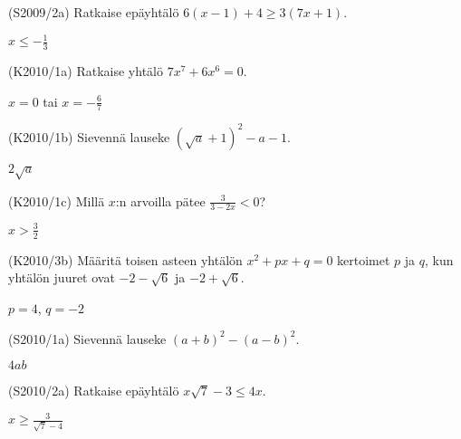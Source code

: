 \begin{tehtava}
(S2009/2a) Ratkaise epäyhtälö $6(x-1)+4 \geq 3(7x+1)$. 
\begin{vastaus}
$x \leq -\frac{1}{3}$
\end{vastaus}
\end{tehtava}


\begin{tehtava}
(K2010/1a) Ratkaise yhtälö $7x^7+6x^6=0$.
\begin{vastaus}
$x=0$ tai $x=-\frac{6}{7}$
\end{vastaus}
\end{tehtava}

\begin{tehtava}
(K2010/1b) Sievennä lauseke $(\sqrt{a}+1)^2-a-1$.
\begin{vastaus}
$2\sqrt{a}$
\end{vastaus}
\end{tehtava}

\begin{tehtava}
(K2010/1c) Millä $x$:n arvoilla pätee $\frac{3}{3-2x}<0$?
\begin{vastaus}
$x>\frac{3}{2}$
\end{vastaus}
\end{tehtava}

\begin{tehtava}
(K2010/3b) Määritä toisen asteen yhtälön $x^2+px+q=0$ kertoimet $p$ ja $q$, kun yhtälön juuret ovat $-2-\sqrt{6}$ ja $-2+\sqrt{6}$.
\begin{vastaus}
$p=4$, $q=-2$
\end{vastaus}
\end{tehtava}

\begin{tehtava}
(S2010/1a) Sievennä lauseke $(a+b)^2-(a-b)^2$.
\begin{vastaus}
$4ab$
\end{vastaus}
\end{tehtava}

\begin{tehtava}
(S2010/2a) Ratkaise epäyhtälö $x\sqrt{7}-3 \leq 4x$.
\begin{vastaus}
$x \geq \frac{3}{\sqrt{7}-4}$
\end{vastaus}
\end{tehtava}

